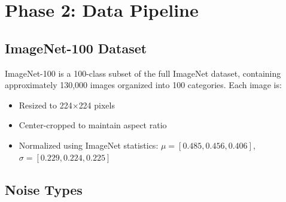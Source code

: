 \documentclass[11pt,a4paper]{article}
\begin{document}


\newpage
\section{Phase 2: Data Pipeline}
\label{sec:phase2}

\subsection{ImageNet-100 Dataset}

ImageNet-100 is a 100-class subset of the full ImageNet dataset, containing approximately 130,000 images organized into 100 categories. Each image is:

\begin{itemize}[noitemsep]
    \item Resized to 224$\times$224 pixels
    \item Center-cropped to maintain aspect ratio
    \item Normalized using ImageNet statistics: $\mu = [0.485, 0.456, 0.406]$, $\sigma = [0.229, 0.224, 0.225]$
\end{itemize}

\subsection{Noise Types}
\end{document}

